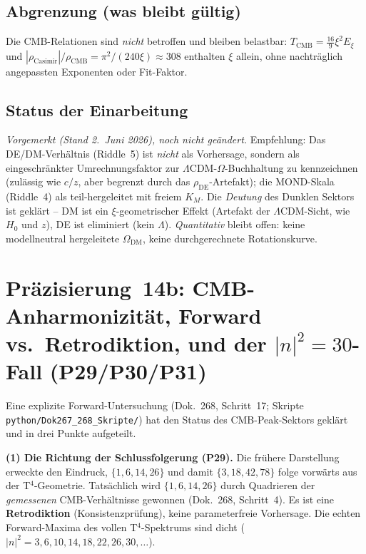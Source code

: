 \subsection*{Abgrenzung (was bleibt gültig)}

Die CMB-Relationen sind \emph{nicht} betroffen und bleiben belastbar:
$T_{\text{CMB}} = \tfrac{16}{9}\xi^2 E_\xi$ und
$|\rho_{\text{Casimir}}|/\rho_{\text{CMB}} = \pi^2/(240\xi) \approx 308$
enthalten $\xi$ allein, ohne nachträglich angepassten Exponenten oder
Fit-Faktor.

\subsection*{Status der Einarbeitung}

\emph{Vorgemerkt (Stand 2.~Juni 2026), noch nicht geändert.} Empfehlung: Das
DE/DM-Verhältnis (Riddle~5) ist \emph{nicht} als Vorhersage, sondern als
eingeschränkter Umrechnungsfaktor zur $\Lambda$CDM-$\Omega$-Buchhaltung zu
kennzeichnen (zulässig wie $c/z$, aber begrenzt durch das $\rho_{\text{DE}}$-Artefakt);
die MOND-Skala (Riddle~4) als teil-hergeleitet mit freiem $K_M$. Die
\emph{Deutung} des Dunklen Sektors ist geklärt -- DM ist ein $\xi$-geometrischer
Effekt (Artefakt der $\Lambda$CDM-Sicht, wie $H_0$ und $z$), DE ist eliminiert
(kein $\Lambda$). \emph{Quantitativ} bleibt offen: keine modellneutral
hergeleitete $\Omega_{\text{DM}}$, keine durchgerechnete Rotationskurve.

\section{\texorpdfstring{Präzisierung~14b: CMB-Anharmonizität, Forward vs.\ Retrodiktion, und der $|n|^2=30$-Fall (P29/P30/P31)}{Praezisierung 14b: CMB-Anharmonizitaet, Forward vs Retrodiktion}}

Eine explizite Forward-Untersuchung (Dok.~268, Schritt~17; Skripte
\texttt{python/Dok267\_268\_Skripte/}) hat den Status des CMB-Peak-Sektors geklärt und
in drei Punkte aufgeteilt.

\textbf{(1) Die Richtung der Schlussfolgerung (P29).}
Die frühere Darstellung erweckte den Eindruck, $\{1,6,14,26\}$ und damit
$\{3,18,42,78\}$ folge vorwärts aus der T$^4$-Geometrie. Tatsächlich wird
$\{1,6,14,26\}$ durch Quadrieren der \emph{gemessenen} CMB-Verhältnisse
gewonnen (Dok.~268, Schritt~4). Es ist eine \textbf{Retrodiktion}
(Konsistenzprüfung), keine parameterfreie Vorhersage. Die echten
Forward-Maxima des vollen T$^4$-Spektrums sind dicht
($|n|^2=3,6,10,14,18,22,26,30,\ldots$).


